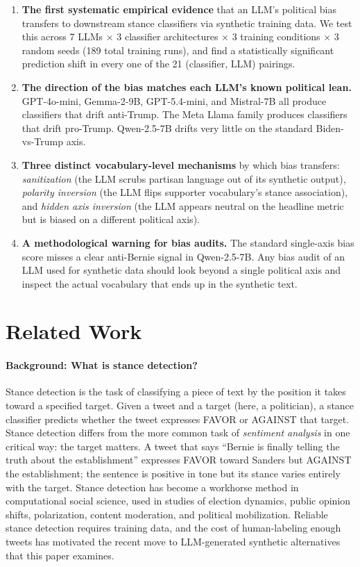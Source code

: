 \documentclass[11pt]{article}
\begin{document}
\begin{enumerate}
    \item \textbf{The first systematic empirical evidence} that an LLM's political bias transfers to downstream stance classifiers via synthetic training data. We test this across 7 LLMs $\times$ 3 classifier architectures $\times$ 3 training conditions $\times$ 3 random seeds (189 total training runs), and find a statistically significant prediction shift in every one of the 21 (classifier, LLM) pairings.
    \item \textbf{The direction of the bias matches each LLM's known political lean.} GPT-4o-mini, Gemma-2-9B, GPT-5.4-mini, and Mistral-7B all produce classifiers that drift anti-Trump. The Meta Llama family produces classifiers that drift pro-Trump. Qwen-2.5-7B drifts very little on the standard Biden-vs-Trump axis.
    \item \textbf{Three distinct vocabulary-level mechanisms} by which bias transfers: \emph{sanitization} (the LLM scrubs partisan language out of its synthetic output), \emph{polarity inversion} (the LLM flips supporter vocabulary's stance association), and \emph{hidden axis inversion} (the LLM appears neutral on the headline metric but is biased on a different political axis).
    \item \textbf{A methodological warning for bias audits.} The standard single-axis bias score misses a clear anti-Bernie signal in Qwen-2.5-7B. Any bias audit of an LLM used for synthetic data should look beyond a single political axis and inspect the actual vocabulary that ends up in the synthetic text.
\end{enumerate}

\section{Related Work}

\paragraph{Background: What is stance detection?}
Stance detection is the task of classifying a piece of text by the position it takes toward a specified target. Given a tweet and a target (here, a politician), a stance classifier predicts whether the tweet expresses FAVOR or AGAINST that target. Stance detection differs from the more common task of \emph{sentiment analysis} in one critical way: the target matters. A tweet that says ``Bernie is finally telling the truth about the establishment'' expresses FAVOR toward Sanders but AGAINST the establishment; the sentence is positive in tone but its stance varies entirely with the target. Stance detection has become a workhorse method in computational social science, used in studies of election dynamics, public opinion shifts, polarization, content moderation, and political mobilization. Reliable stance detection requires training data, and the cost of human-labeling enough tweets has motivated the recent move to LLM-generated synthetic alternatives that this paper examines.
\end{document}
